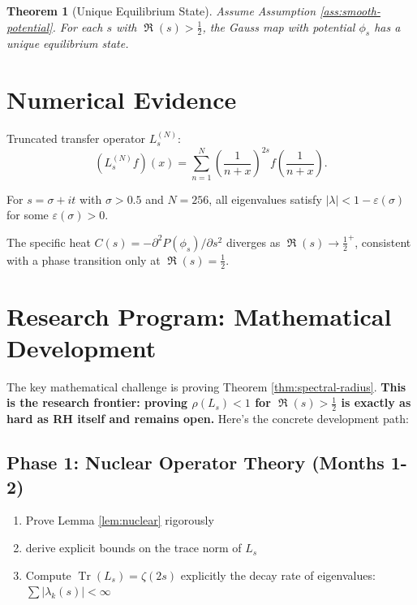 \documentclass[11pt,a4paper]{article}
\newtheorem{theorem}{Theorem}[section]
\theoremstyle{definition}
\DeclareMathOperator{\Ree}{\Re}
\DeclareMathOperator{\Tr}{Tr}
\newcommand{\half}{\frac{1}{2}}
\newcommand{\eps}{\varepsilon}
\newcommand{\la}{\lambda}
\newcommand{\Zeta}{\zeta}
\begin{document}
\begin{theorem}[Unique Equilibrium State]
\label{thm:unique-equilibrium}
Assume Assumption \ref{ass:smooth-potential}. For each $s$ with $\Ree(s) > \half$, the Gauss map with potential $\phi_s$ has a unique equilibrium state.
\end{theorem}

\section{Numerical Evidence}
\label{sec:numerical}

Truncated transfer operator $L_s^{(N)}$:
\begin{equation*}
(L_s^{(N)} f)(x) = \sum_{n=1}^N \left(\frac{1}{n + x}\right)^{2s} f\left(\frac{1}{n + x}\right).
\end{equation*}

\begin{observation}
For $s = \sigma + it$ with $\sigma > 0.5$ and $N=256$, all eigenvalues satisfy $|\la| < 1 - \eps(\sigma)$ for some $\eps(\sigma) > 0$.
\end{observation}

\begin{observation}
The specific heat $C(s) = -\partial^2 P(\phi_s)/\partial s^2$ diverges as $\Ree(s) \to \half^+$, consistent with a phase transition only at $\Ree(s) = \half$.
\end{observation}

\section{Research Program: Mathematical Development}
\label{sec:research-program}

The key mathematical challenge is proving Theorem \ref{thm:spectral-radius}. {\bf This is the research frontier: proving $\rho(L_s) < 1$ for $\Ree(s) > \half$ is exactly as hard as RH itself and remains open.} Here's the concrete development path:

\subsection{Phase 1: Nuclear Operator Theory (Months 1-2)}
\label{sec:phase1}

\begin{enumerate}
\item Prove Lemma \ref{lem:nuclear} rigorously
\item derive explicit bounds on the trace norm of $L_s$
\item Compute $\Tr(L_s) = \Zeta(2s)$ explicitly
\itemStudy the decay rate of eigenvalues: $\sum |\la_k(s)| < \infty$
\end{enumerate}
\end{document}
